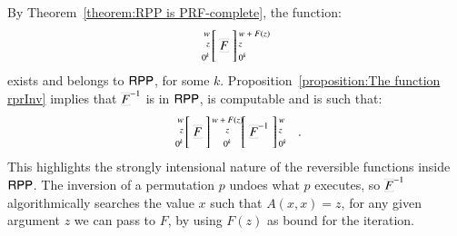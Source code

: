By Theorem~\ref{theorem:RPP is PRF-complete}, the function:
\begin{align*}
\arraycolsep=1.4pt
\begin{array}{rcl}
 \left. {\scriptsize 
         \begin{array}{r} 
           w  \\ z  \\[1mm] 0^{k}
         \end{array}} \right[
 & \prrpr{F} &
 \left] {\scriptsize 
         \begin{array}{l} 
           w + F(z)\\ z \\[1mm] 0^{k}
         \end{array}} \right.
\end{array}
\end{align*}
exists and belongs to $\mathsf{RPP} $, for some $ k $. 
Proposition~\ref{proposition:The function rprInv} implies that $ \rprInv{\prrpr{F}} $ is in 
$ \mathsf{RPP} $, is computable and is such that:
\begin{align*}
\arraycolsep=1.4pt
\begin{array}{rcl}
 \left. {\scriptsize 
         \begin{array}{r} 
           w  \\ z  \\[1mm] 0^{k}
         \end{array}} \right[
 & \prrpr{F} &
 \left] {\scriptsize 
         \begin{array}{c} 
           w + F(z)\\ z \\[1mm] 0^{k}
         \end{array}} 
 \right.
\end{array}
\arraycolsep=1.4pt
\hspace{-0.6cm}
\begin{array}{rcl}
 \left. {\phantom{
         \scriptsize 
         \begin{array}{r} 
           w  \\ z  \\[1mm] 0^{k}
         \end{array}
         }} \right[
 & \rprInv{\prrpr{F}} &
 \left] {\scriptsize 
         \begin{array}{l} 
           w \\ z \\[1mm] 0^{k}
         \end{array}} 
 \right.
\end{array}
\enspace .
\end{align*}
This highlights the strongly intensional nature of the reversible functions inside $ \mathsf{RPP} $.
The inversion of a permutation $p$ undoes what $ p $ executes, so
$ \rprInv{\prrpr{F}} $ algorithmically searches the value $ x $ such that $ A(x,x) = z $,  
for any given argument $ z $ we can pass to $ F $, by using $F(z)$ as bound for the iteration.

